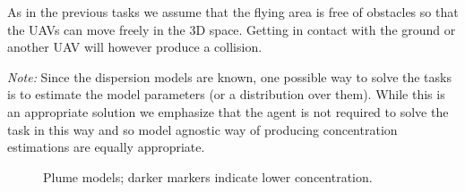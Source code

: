 \documentclass[a4paper,11pt]{report}
\begin{document}
As in the previous tasks we assume that the flying area is free of obstacles so that the UAVs can move freely in the 3D space. Getting in contact with the ground or another UAV will however produce a collision.

\textit{Note:}
Since the dispersion models are known, one possible way to solve the tasks is to estimate the model parameters (or a distribution over them). While this is an appropriate solution we emphasize that the agent is not required to solve the task in this way and so model agnostic way of producing concentration estimations are equally appropriate. 

\begin{figure}[t]
\centering
{}
\caption{Plume models; darker markers indicate lower concentration.\label{fig:plume}}
\end{figure}
\end{document}

